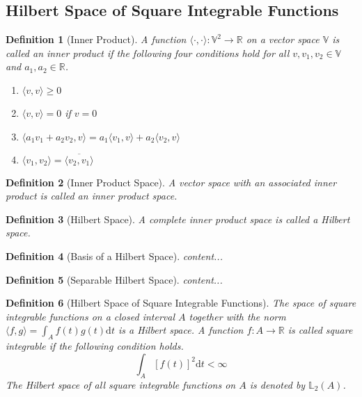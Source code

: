 \documentclass[11pt,twoside,a4paper]{article}
\theoremstyle{assumpstyle} \newtheorem{assumption}{Assumption}
\theoremstyle{assumpstyle} \newtheorem{definition}{Definition}
\begin{document}
		\subsection{Hilbert Space of Square Integrable Functions}
			\begin{definition}[Inner Product]
				A function $\langle \cdot , \cdot \rangle : \mathbb{V}^2 \rightarrow \mathbb{R}$ on a vector space $\mathbb{V}$ is called an inner product if the following four conditions hold for all $v, v_1, v_2 \in \mathbb{V}$ and $a_1, a_2 \in \mathbb{R}$.
				\begin{multicols}{2}
					\begin{enumerate}
						\item $\langle v,v \rangle \geq 0$
						\item $\langle v,v \rangle = 0$ if $v = 0$
						\item $\langle a_1 v_1 + a_2 v_2, v \rangle = a_1 \langle v_1, v \rangle + a_2 \langle v_2, v \rangle$
						\item $\langle v_1, v_2 \rangle = \overline{\langle v_2, v_1 \rangle}$
					\end{enumerate}
				\end{multicols}
			\end{definition}
			
			\cite{hsing_theoretical_2015}
			\begin{definition}[Inner Product Space]
				A vector space with an associated inner product is called an inner product space.
			\end{definition}
		
			\cite{hsing_theoretical_2015}
			\begin{definition}[Hilbert Space]
				A complete inner product space is called a Hilbert space.
			\end{definition}
		
			\begin{definition}[Basis of a Hilbert Space]
				content...
			\end{definition}
		
			\begin{definition}[Separable Hilbert Space]
				content...
			\end{definition}
		
			\begin{definition}[Hilbert Space of Square Integrable Functions]
				
				The space of square integrable functions on a closed interval $A$ together with the norm $\langle f,g\rangle = \int_A f(t)g(t) \mathrm{d}t$ is a Hilbert space.
				A function $f: A \rightarrow \mathbb{R}$ is called square integrable if the following condition holds.
				\begin{equation}
					\int_{A} \left[f(t)\right]^2\mathrm{d}t < \infty
				\end{equation}
				The Hilbert space of all square integrable functions on $A$ is denoted by $\mathbb{L}_2(A)$.
			\end{definition}
		
\end{document}
